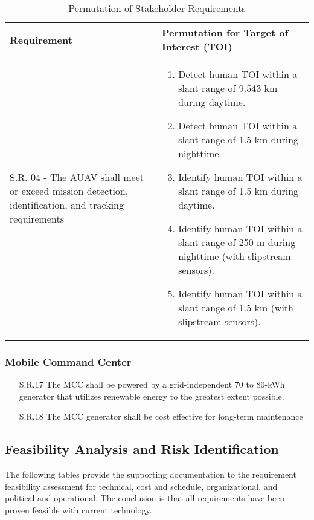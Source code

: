 \begin{fullwidth}
    \begin{table}[]
        \centering
        \begin{tabular}{| L{0.5\linewidth} | L{0.5\linewidth} |}
            \hline
            \textbf{Requirement} & \textbf{Permutation for Target of Interest (TOI)} \\
            \hline
            S.R. 04 - The AUAV shall meet or exceed mission detection, identification, and tracking requirements & 
            \begin{enumerate}
                \item Detect human TOI within a slant range of 9.543 km during daytime.
                \item Detect human TOI within a slant range of 1.5 km during nighttime.
                \item Identify human TOI within a slant range of 1.5 km during daytime.
                \item Identify human TOI within a slant range of 250 m during nighttime (with slipstream sensors).
                \item Identify human TOI within a slant range of 1.5 km (with slipstream sensors).
             \end{enumerate} \\
            \hline
        \end{tabular}
        \caption{Permutation of Stakeholder Requirements }
        \label{tab:permutation_of_stakeholder_reqs}
    \end{table}
    
    \subsubsection*{Mobile Command Center}
    \begin{enumerate}
        \item[S.R.17]{The MCC shall be powered by a grid-independent 70 to 80-kWh generator that utilizes renewable energy to the greatest extent possible.}
        \item[S.R.18]{The MCC generator shall be cost effective for long-term maintenance}
    \end{enumerate}

\subsection{Feasibility Analysis and Risk Identification}
    The following tables provide the supporting documentation to the requirement feasibility assessment for technical, cost and schedule, organizational, and political and operational. The conclusion is that all requirements have been proven feasible with current technology.
    

\end{fullwidth}
